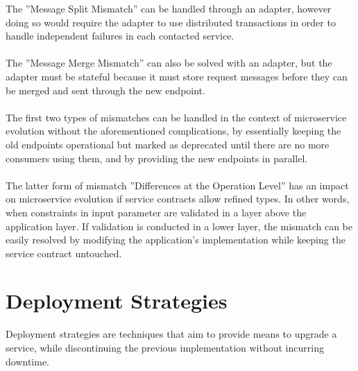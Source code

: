 The ''Message Split Mismatch'' can be handled through an adapter, however doing so
would require the adapter to use distributed transactions in order to handle independent failures in each contacted service.

\paragraph{}

The ''Message Merge Mismatch'' can also be solved with an adapter, but the adapter must be stateful because it must store request messages before they can be merged and sent through the new endpoint.

\paragraph{}

The first two types of mismatches can be handled in the context of microservice evolution without the aforementioned complications,
by essentially keeping the old endpoints operational but marked as deprecated until  there are no more consumers using them, and by providing the new endpoints in parallel.

\paragraph{}

The latter form of mismatch ''Differences at the Operation Level'' has an impact on microservice evolution if service contracts allow refined types.
In other words, when constraints in input parameter are validated in a layer above the application layer.
If validation is conducted in a lower layer, the mismatch can be easily resolved by modifying the application's implementation while keeping the service contract untouched.

\section{Deployment Strategies} %
\label{sec:deployment_strategies}

Deployment strategies are techniques that aim to provide means to upgrade a service,
while discontinuing the previous implementation without incurring downtime.

\paragraph{}

